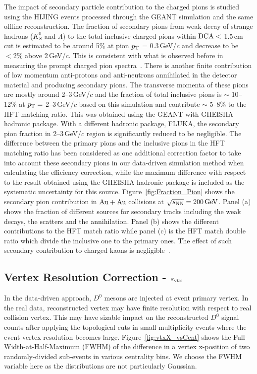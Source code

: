 \documentclass[%
 reprint,	
 amsmath,amssymb,
 aps,
 prc,
]{revtex4-1}
\begin{document}
The impact of secondary particle contribution to the charged pions is studied using the HIJING events processed through the GEANT simulation and the same offline reconstruction. The fraction of secondary pions from weak decay of strange hadrons ($K^0_S$ and $\Lambda$) to the total inclusive charged pions within ${\rm DCA}<$ 1.5\,cm cut is estimated to be around 5\% at pion $p_{\rm T}$ = 0.3\,GeV/$c$ and decrease to be $<2\%$ above 2\,GeV/$c$. This is consistent with what is observed before in measuring the prompt charged pion spectra~\cite{Adams:2003xp}. There is another finite contribution of low momentum anti-protons and anti-neutrons annihilated in the detector material and producing secondary pions. The transverse momenta of these pions are mostly around 2--3\,GeV/$c$ and the fraction of total inclusive pions is $\sim$ 10--12\% at $p_{\rm T}=$ 2--3\,GeV/$c$ based on this simulation and contribute $\sim$ 5--8\% to the HFT matching ratio. This was obtained using the GEANT with GHEISHA hadronic package. With a different hadronic package, FLUKA, the secondary pion fraction in 2--3\,GeV/$c$ region is significantly reduced to be negligible. The difference between the primary pions and the inclusive pions in the HFT matching ratio has been considered as one additional correction factor to take into account these secondary pions in our data-driven simulation method when calculating the efficiency correction, while the maximum difference with respect to the result obtained using the GHEISHA hadronic package is included as the systematic uncertainty for this source.  Figure~\ref{fig:Fraction_Pion} shows the secondary pion contribution in ${\rm{Au + Au}}$ collisions at ${\sqrt{s_{\rm NN}} = \rm{200\,GeV}}$. Panel (a) shows the fraction of different sources for secondary tracks including the weak decays, the scatters and the annihilation. Panel (b) shows the different contributions to the HFT match ratio while panel (c) is the HFT match double ratio which divide the inclusive one to the primary ones. The effect of such secondary contribution to charged kaons is negligible~\cite{Adams:2003xp}.

\subsection{\label{sec:correction:vtx}Vertex Resolution Correction - $\varepsilon_{\rm vtx}$}

In the data-driven approach, $D^0$ mesons are injected at event primary vertex. In the real data, reconstructed vertex may have finite resolution with respect to real collision vertex. This may have sizable impact on the reconstructed $D^0$ signal counts after applying the topological cuts in small multiplicity events where the event vertex resolution becomes large. Figure~\ref{fig:vtxX_vsCent} shows the Full-Width-at-Half-Maximum (FWHM) of the difference in a vertex x-position of two randomly-divided sub-events in various centrality bins. We choose the FWHM variable here as the distributions are not particularly Gaussian.
\end{document}
